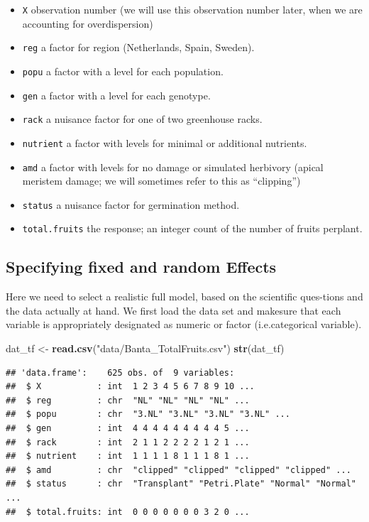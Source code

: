 \documentclass[
  12pt,
]{book}
\newenvironment{Shaded}{\begin{snugshade}}{\end{snugshade}}
\newcommand{\KeywordTok}[1]{\textcolor[rgb]{0.13,0.29,0.53}{\textbf{#1}}}
\newcommand{\NormalTok}[1]{#1}
\newcommand{\StringTok}[1]{\textcolor[rgb]{0.31,0.60,0.02}{#1}}
\providecommand{\tightlist}{%
  \setlength{\itemsep}{0pt}\setlength{\parskip}{0pt}}
\begin{document}
\begin{itemize}
\tightlist
\item
  \texttt{X} observation number (we will use this observation number later, when we are accounting for overdispersion)
\item
  \texttt{reg} a factor for region (Netherlands, Spain, Sweden).
\item
  \texttt{popu} a factor with a level for each population.
\item
  \texttt{gen} a factor with a level for each genotype.
\item
  \texttt{rack} a nuisance factor for one of two greenhouse racks.
\item
  \texttt{nutrient} a factor with levels for minimal or additional nutrients.
\item
  \texttt{amd} a factor with levels for no damage or simulated herbivory (apical meristem damage; we will sometimes refer to this as ``clipping'')
\item
  \texttt{status} a nuisance factor for germination method.
\item
  \texttt{total.fruits} the response; an integer count of the number of fruits perplant.
\end{itemize}

\hypertarget{specifying-fixed-and-random-effects}{%
\subsection{Specifying fixed and random Effects}\label{specifying-fixed-and-random-effects}}

Here we need to select a realistic full model, based on the scientific ques-tions and the data actually at hand. We first load the data set and makesure that each variable is appropriately designated as numeric or factor (i.e.categorical variable).

\begin{Shaded}
\begin{Highlighting}[]
\NormalTok{dat_tf <-}\StringTok{ }\KeywordTok{read.csv}\NormalTok{(}\StringTok{"data/Banta_TotalFruits.csv"}\NormalTok{)}
\KeywordTok{str}\NormalTok{(dat_tf)}
\end{Highlighting}
\end{Shaded}

\begin{verbatim}
## 'data.frame':    625 obs. of  9 variables:
##  $ X           : int  1 2 3 4 5 6 7 8 9 10 ...
##  $ reg         : chr  "NL" "NL" "NL" "NL" ...
##  $ popu        : chr  "3.NL" "3.NL" "3.NL" "3.NL" ...
##  $ gen         : int  4 4 4 4 4 4 4 4 4 5 ...
##  $ rack        : int  2 1 1 2 2 2 2 1 2 1 ...
##  $ nutrient    : int  1 1 1 1 8 1 1 1 8 1 ...
##  $ amd         : chr  "clipped" "clipped" "clipped" "clipped" ...
##  $ status      : chr  "Transplant" "Petri.Plate" "Normal" "Normal" ...
##  $ total.fruits: int  0 0 0 0 0 0 0 3 2 0 ...
\end{verbatim}
\end{document}
